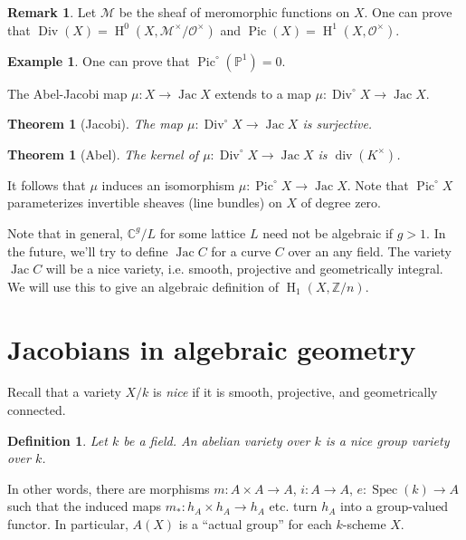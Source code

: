 \documentclass{article}
\DeclareMathOperator{\Div}{Div}
\DeclareMathOperator{\h}{H}
\DeclareMathOperator{\jac}{Jac}
\DeclareMathOperator{\pic}{Pic}
\DeclareMathOperator{\spec}{Spec}
\newtheorem{theorem}[subsection]{Theorem}
\newtheorem{definition}[subsection]{Definition}
\theoremstyle{definition}
\newtheorem{example}[subsection]{Example}
\newtheorem{remark}[subsection]{Remark}
\begin{document}
\begin{remark}
Let $\mathscr{M}$ be the sheaf of meromorphic functions on $X$. One can 
prove that $\Div(X)=\h^0(X,\mathscr{M}^\times/\mathscr{O}^\times)$ and 
$\pic(X)=\h^1(X,\mathscr{O}^\times)$. 
\end{remark}

\begin{example}
One can prove that $\pic^\circ(\mathbb{P}^1) = 0$.
\end{example}

The Abel-Jacobi map $\mu:X\to \jac X$ extends to a map 
$\mu:\Div^\circ X\to \jac X$. 

\begin{theorem}[Jacobi]
The map $\mu:\Div^\circ X\to\jac X$ is surjective.
\end{theorem}

\begin{theorem}[Abel]
The kernel of $\mu:\Div^\circ X\to \jac X$ is $\operatorname{div}(K^\times)$. 
\end{theorem}

It follows that $\mu$ induces an isomorphism $\mu:\pic^\circ X\to \jac X$. 
Note that $\pic^\circ X$ parameterizes invertible sheaves (line bundles) on 
$X$ of degree zero. 

Note that in general, $\mathbb{C}^g/L$ for some lattice $L$ need not be 
algebraic if $g>1$. In the future, we'll try to define $\jac C$ for a curve 
$C$ over an any field. The variety $\jac C$ will be a nice variety, i.e. 
smooth, projective and geometrically integral. We will use this to give an 
algebraic definition of $\h_1(X,\mathbb{Z}/n)$. 





\section{Jacobians in algebraic geometry}

Recall that a variety $X/k$ is \emph{nice} if it is smooth, projective, and 
geometrically connected. 

\begin{definition}
Let $k$ be a field. An \emph{abelian variety} over $k$ is a nice group variety 
over $k$.
\end{definition}

In other words, there are morphisms $m:A\times A\to A$, $i:A\to A$, 
$e:\spec(k)\to A$ such that the induced maps $m_*:h_A\times h_A\to h_A$ etc. 
turn $h_A$ into a group-valued functor. In particular, $A(X)$ is a ``actual 
group'' for each $k$-scheme $X$. 
\end{document}
